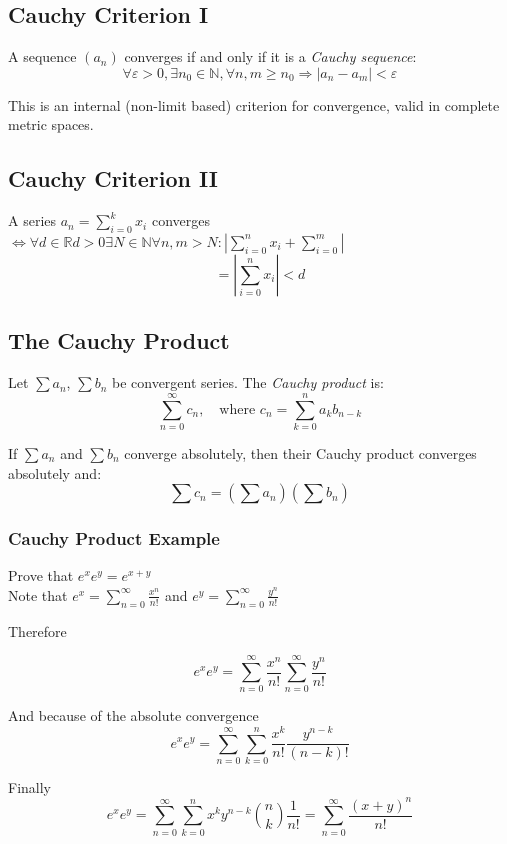 \subsection{Cauchy Criterion I}

A sequence \((a_n)\) converges if and only if it is a \emph{Cauchy sequence}:
\[
\forall \varepsilon > 0, \exists n_0 \in \mathbb{N}, \forall n, m \ge n_0 \Rightarrow |a_n - a_m| < \varepsilon
\]

This is an internal (non-limit based) criterion for convergence, valid in complete metric spaces.

\subsection{Cauchy Criterion II}
A series \(a_n = \sum_{i = 0}^{k}x_i\) converges \(\iff \forall d \in \mathbb{R} d > 0 
\exists N \in \mathbb{N} \forall n,m > N: \left| \sum_{i = 0}^{n}x_i + \sum_{i=0}^{m}\right|\)
\[= \left|\sum_{i = 0}^{n}x_i\right| < d\]


\subsection{The Cauchy Product}

Let \(\sum a_n\), \(\sum b_n\) be convergent series. The \emph{Cauchy product} is:
\[
\sum_{n=0}^\infty c_n, \quad \text{where } c_n = \sum_{k=0}^n a_k b_{n-k}
\]

If \(\sum a_n\) and \(\sum b_n\) converge absolutely, then their Cauchy product converges absolutely and:
\[
\sum c_n = \left( \sum a_n \right) \left( \sum b_n \right)
\]

\subsubsection{Cauchy Product Example}

Prove that \(e^x  e^y = e^{x + y}\)\\
Note that \(e^x = \sum_{n = 0}^{\infty} \frac{x^n}{n!}\) and \(e^y = \sum_{n = 0}^{\infty} \frac{y^n}{n!}\)

Therefore

\[
  e^x e^y = \sum_{n = 0}^{\infty} \frac{x^n}{n!} \sum_{n = 0}^{\infty} \frac{y^n}{n!}
\]

And because of the absolute convergence
\[
  e^x e^y = \sum_{n = 0}^{\infty}\sum_{k = 0}^{n} \frac{x^k}{n!} \frac{y^{n - k}}{(n-k)!}
\]

Finally
\[
  e^x e^y = \sum_{n = 0}^{\infty}\sum_{k = 0}^{n}x^k y^{n - k} \binom{n}{k} \frac{1}{n!} = \sum_{n = 0}^{\infty} \frac{(x + y)^n}{n!}
\]
\QED
